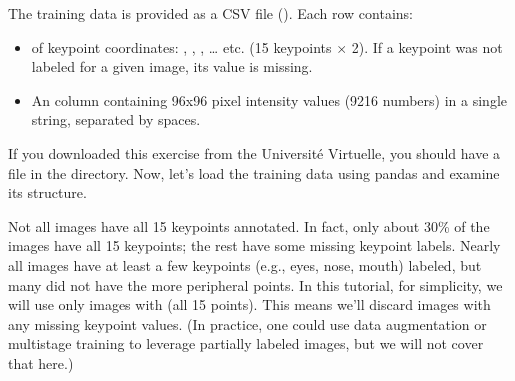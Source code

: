 \documentclass[letterpaper,10pt,english]{jupyterBook}
\begin{document}
\sphinxAtStartPar
{}

\sphinxAtStartPar
The training data is provided as a CSV file (). Each row contains:
\begin{itemize}
\item {} 
\sphinxAtStartPar
{} of keypoint coordinates: , , , … etc. (15 keypoints \(\times\) 2). If a keypoint was not labeled for a given image, its value is missing.

\item {} 
\sphinxAtStartPar
An  column containing 96x96 pixel intensity values (9216 numbers) in a single string, separated by spaces.

\end{itemize}

\sphinxAtStartPar
If you downloaded this exercise from the Université Virtuelle, you should have a  file in the  directory. Now, let’s load the training data using pandas and examine its structure.

\sphinxAtStartPar
{}

\sphinxAtStartPar
Not all images have all 15 keypoints annotated. In fact, only about 30\% of the images have all 15 keypoints; the rest have some missing keypoint labels. Nearly all images have at least a few keypoints (e.g., eyes, nose, mouth) labeled, but many did not have the more peripheral points. In this tutorial, for simplicity, we will use only images with  (all 15 points). This means we’ll discard images with any missing keypoint values. (In practice, one could use data augmentation or multi\sphinxhyphen{}stage training to leverage partially labeled images, but we will not cover that here.)
\end{document}
